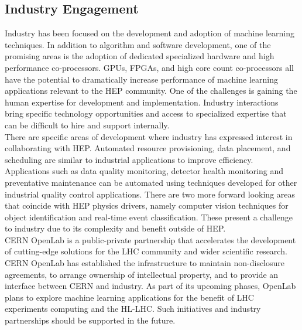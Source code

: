 
\subsection{Industry Engagement}
Industry has been focused on the development and adoption of machine learning techniques. In addition to algorithm and software development, one of the promising areas is the adoption of dedicated specialized hardware and high performance co-processors. GPUs, FPGAs, and high core count co-processors all have the potential to dramatically increase performance of machine learning applications relevant to the HEP community.
One of the challenges is gaining the human expertise for development and implementation. Industry interactions bring specific technology opportunities and access to specialized expertise that can be difficult to hire and support internally.\\

There are specific areas of development where industry has expressed interest in collaborating with HEP.  Automated resource provisioning, data placement, and scheduling are similar to industrial applications to improve efficiency. Applications such as data quality monitoring, detector health monitoring and preventative maintenance can be automated using techniques developed for other industrial quality control applications. There are two more forward looking areas that coincide with HEP physics drivers, namely computer vision techniques for object identification and real-time event classification. These present a challenge to industry due to its complexity and benefit outside of HEP.\\


CERN OpenLab is a public-private partnership that accelerates the development of cutting-edge solutions for the LHC community and wider scientific research. CERN OpenLab has established the infrastructure to maintain non-disclosure agreements, to arrange ownership of intellectual property, and to provide an interface between CERN and industry. As part of its upcoming phases, OpenLab plans to explore machine learning applications for the benefit of LHC experiments computing and the HL-LHC. Such initiatives and industry partnerships should be supported in the future.

